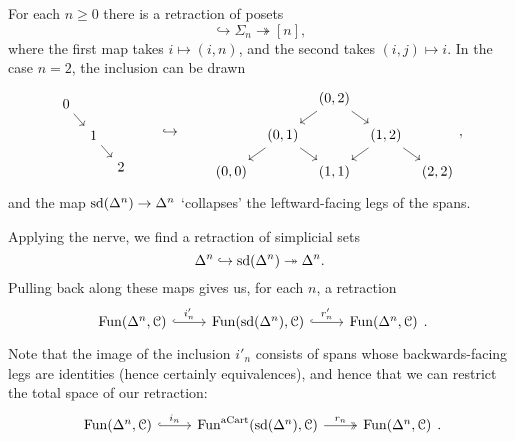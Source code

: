 \documentclass[main.tex]{subfiles}
\begin{document}
\begin{example}
  For each $n \geq 0$ there is a retraction of posets
  \begin{equation*}
    [n] \hookrightarrow \Sigma_{n} \twoheadrightarrow [n],
  \end{equation*}
  where the first map takes $i \mapsto (i, n)$, and the second takes $(i, j) \mapsto i$. In the case $n = 2$, the inclusion can be drawn
  \begin{equation*}
    \begin{tikzcd}[row sep=small, column sep=tiny]
      0
      \arrow[dr]
      \\
      & 1
      \arrow[dr]
      \\
      && 2
    \end{tikzcd}
    \qquad \hookrightarrow \qquad
    \begin{tikzcd}[row sep=small, column sep=tiny]
      && (0, 2)
      \arrow[dl]
      \arrow[dr]
      \\
      & (0, 1)
      \arrow[dl]
      \arrow[dr]
      && (1, 2)
      \arrow[dl]
      \arrow[dr]
      \\
      (0, 0)
      && (1, 1)
      && (2, 2)
    \end{tikzcd},
  \end{equation*}
  and the map $\mathrm{sd}(\Delta^{n}) \to \Delta^{n}$ `collapses' the leftward-facing legs of the spans.

  Applying the nerve, we find a retraction of simplicial sets
  \begin{equation*}
    \Delta^{n} \hookrightarrow \mathrm{sd}(\Delta^{n}) \twoheadrightarrow \Delta^{n}.
  \end{equation*}
  Pulling back along these maps gives us, for each $n$, a retraction
  \begin{equation*}
    \begin{tikzcd}
      \Fun(\Delta^{n}, \category{C}) 
      \arrow[r, hook, "i'_{n}"]
      & \Fun(\sd(\Delta^{n}), \category{C}) 
      \arrow[r, hook, "r'_{n}"]
      & \Fun(\Delta^{n}, \category{C})
    \end{tikzcd}.
  \end{equation*}
  Note that the image of the inclusion $i'_{n}$ consists of spans whose backwards-facing legs are identities (hence certainly equivalences), and hence that we can restrict the total space of our retraction:
  \begin{equation*}
    \begin{tikzcd}
      \Fun(\Delta^{n}, \category{C}) 
      \arrow[r, hook, "i_{n}"]
      & \Fun^{\aCart}(\sd(\Delta^{n}), \category{C}) 
      \arrow[r, two heads, "r_{n}"]
      & \Fun(\Delta^{n}, \category{C})
    \end{tikzcd}.
  \end{equation*}


\end{example}
\end{document}
